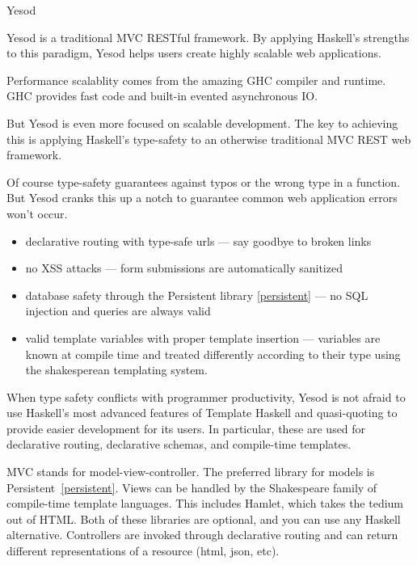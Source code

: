 \begin{hcarentry}{Yesod} 
\label{yesod}
\makeheader

Yesod is a traditional MVC RESTful framework. By applying Haskell's strengths to this paradigm, Yesod helps users create highly scalable web applications.

Performance scalablity comes from the amazing GHC compiler and runtime. GHC provides fast code and built-in evented asynchronous IO.

But Yesod is even more focused on scalable development. The key to achieving this is applying Haskell's type-safety to an otherwise traditional MVC REST web framework.

Of course type-safety guarantees against typos or the wrong type in a function. But Yesod cranks this up a notch to guarantee common web application errors won't occur.
\begin{itemize}
\item declarative routing with type-safe urls --- say goodbye to broken links
\item no XSS attacks --- form submissions are automatically sanitized
\item database safety through the Persistent library \cref{persistent} --- no SQL injection and queries are always valid
\item valid template variables with proper template insertion --- variables are known at compile time and treated differently according to their type using the shakesperean templating system.
\end{itemize}

When type safety conflicts with programmer productivity,
Yesod is not afraid to use Haskell's most advanced features
of Template Haskell and quasi-quoting to provide
easier development for its users. In particular, these are used for
declarative routing, declarative schemas, and compile-time templates.

MVC stands for model-view-controller. The preferred library for models
is Persistent~\cref{persistent}. Views can be handled by the Shakespeare family of compile-time template languages. This includes Hamlet, which takes the tedium out of HTML. Both of these libraries are optional, and you can use any Haskell alternative. Controllers are invoked through declarative routing and can return different representations of a resource (html, json, etc).


\end{hcarentry}

